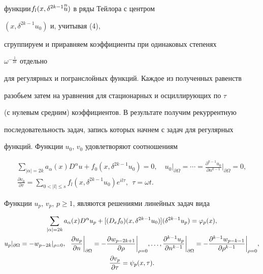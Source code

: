 функции\linebreak $f_l(x,\delta^{2k-1}\overset{n}{u}{})$ в ряды Тейлора с центром 


$(x,\delta^{2k-1}u_0)$ и, учитывая (4),  


сгруппируем и приравняем коэффициенты при одинаковых степенях 


$\omega^{-\frac{1}{2k}}$ отдельно  


для регулярных и погранслойных функций. Каждое из полученных равенств  


разобьем затем на уравнения для стационарных и осциллирующих по $\tau$ 


(с нулевым средним) коэффициентов. В результате получим рекуррентную 


последовательность задач, запись которых начнем с задач для регулярных 


функций. Функции $u_0$, $v_0$ удовлетворяют соотношениям 


\begin{gather} 


\sum_{|\alpha|=2k}a_\alpha(x)D^\alpha u+f_0(x,\delta^{2k-1}u_0) 


=0,\quad u_0|_{\partial\Omega}=\dotsb= 


\frac{\partial^{k-1}u_0}{\partial n^{k-1}}\bigg|_{\partial\Omega}=0,\\ 


% 


\frac{\partial v_0}{\partial\tau}=\sum_{0<|l|\le s}f_l 


(x,\delta^{2k-1}u_0)e^{i l\tau},\ \ \tau=\omega t. 


\end{gather} 


Функции $u_p$, $v_p$, $p\ge1$, являются решениями линейных задач вида 


\begin{gather} 


\sum_{|\alpha|=2k}a_\alpha(x)D^\alpha u_p+[(D_e f_0) 


(x,\delta^{2k-1}u_0)](\delta^{2k-1}u_p)=\varphi_p(x), \\ 


% 


u_p|_{\partial\Omega}=-w_{p-2k}|_{\rho=0}, 


\ \ \frac{\partial u_p}{\partial n}\bigg|_{\partial\Omega}= 


-\frac{\partial w_{p-2k+1}}{\partial\rho}\bigg|_{\rho=0},\dotsc, 


\frac{\partial^{k-1}u_p}{\partial n^{k-1}}\bigg|_{\partial\Omega}= 


-\frac{\partial^{k-1}w_{p-k-1}}{\partial\rho^{k-1}}\bigg|_{\rho=0}, 


\notag \\ 


\frac{\partial v_p}{\partial\tau}=\psi_p(x,\tau). 


\end{gather} 



